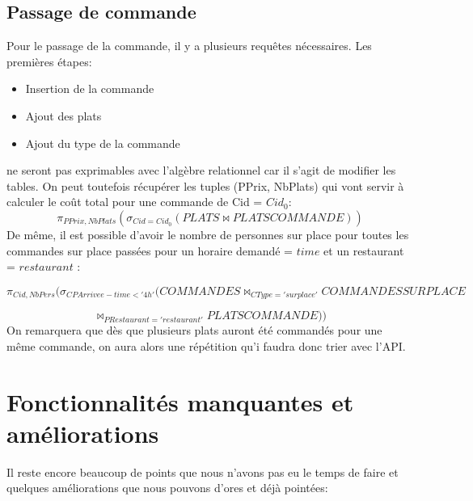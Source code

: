 \documentclass[10pt, a4paper]{article}
\begin{document}
\subsection{Passage de commande}
Pour le passage de la commande, il y a plusieurs requêtes nécessaires.
Les premières étapes:
\begin{itemize}
    \item Insertion de la commande
    \item Ajout des plats
    \item Ajout du type de la commande
\end{itemize}
ne seront pas exprimables avec l'algèbre relationnel car il s'agit de modifier les tables.
On peut toutefois récupérer les tuples (PPrix, NbPlats) qui vont servir à calculer le coût total pour une commande de Cid = $Cid_0$:
$$
    \pi_{PPrix, NbPlats}( \sigma_{Cid = Cid_0}(PLATS \Join PLATSCOMMANDE))
$$
De même, il est possible d'avoir le nombre de personnes sur place pour toutes les commandes sur place passées pour un horaire demandé = $time$ et un restaurant = $restaurant$ :

$$
    \pi_{Cid, NbPers}(\sigma_{CPArrivee - time < '4h'}(COMMANDES \Join_{CType = 'sur place'} COMMANDESSURPLACE
    $$

    $$
    \Join_{PRestaurant = 'restaurant'} PLATSCOMMANDE))
$$
On remarquera que dès que plusieurs plats auront été commandés pour une même commande, on aura alors
une répétition qu'i faudra donc trier avec l'API.

\section{Fonctionnalités manquantes et améliorations}

Il reste encore beaucoup de points que nous n'avons pas eu le temps de faire et quelques améliorations que nous pouvons d'ores et déjà pointées:
\end{document}
